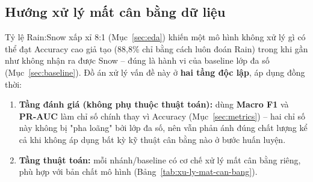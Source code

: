 \subsection{Hướng xử lý mất cân bằng dữ liệu}
\label{sec:xu-ly-mat-can-bang}

Tỷ lệ Rain:Snow xấp xỉ 8:1 (Mục~\ref{sec:eda}) khiến một mô hình không xử lý gì có thể đạt
Accuracy cao giả tạo (88,8\% chỉ bằng cách luôn đoán Rain) trong khi gần như không nhận ra
được Snow -- đúng là hành vi của baseline lớp đa số (Mục~\ref{sec:baseline}). Đồ án xử lý
vấn đề này ở \textbf{hai tầng độc lập}, áp dụng đồng thời:

\begin{enumerate}
  \item \textbf{Tầng đánh giá (không phụ thuộc thuật toán):} dùng \textbf{Macro F1} và
        \textbf{PR-AUC} làm chỉ số chính thay vì Accuracy (Mục~\ref{sec:metrics}) -- hai chỉ
        số này không bị "pha loãng" bởi lớp đa số, nên vẫn phản ánh đúng chất lượng kể cả
        khi không áp dụng bất kỳ kỹ thuật cân bằng nào ở bước huấn luyện.
  \item \textbf{Tầng thuật toán:} mỗi nhánh/baseline có cơ chế xử lý mất cân bằng riêng,
        phù hợp với bản chất mô hình (Bảng~\ref{tab:xu-ly-mat-can-bang}).
\end{enumerate}

